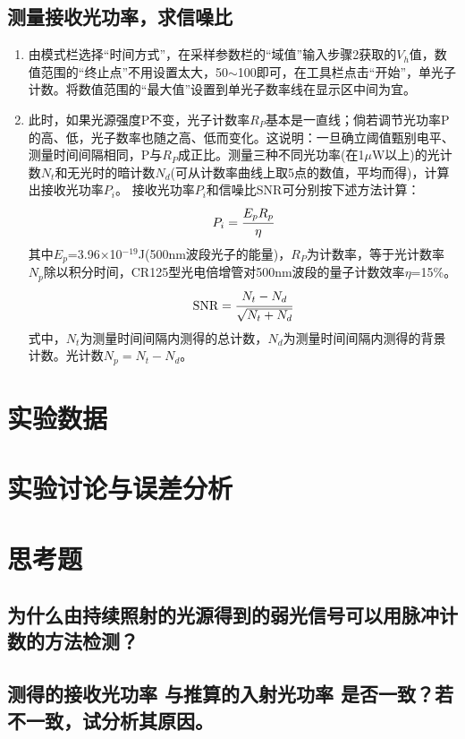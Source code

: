 \documentclass[a4paper]{article}
\begin{document}
\subsection{测量接收光功率，求信噪比}
\begin{enumerate}
\item 由模式栏选择“时间方式”，在采样参数栏的“域值”输入步骤2获取的$V_h$值，数值范围的“终止点”不用设置太大，50$\sim$100即可，在工具栏点击“开始”，单光子计数。将数值范围的“最大值”设置到单光子数率线在显示区中间为宜。 
\item 此时，如果光源强度P不变，光子计数率$R_P$基本是一直线；倘若调节光功率P的高、低，光子数率也随之高、低而变化。这说明：一旦确立阈值甄别电平、测量时间间隔相同，P与$R_P$成正比。测量三种不同光功率(在1$\mu$W以上)的光计数$N_t$和无光时的暗计数$N_d$(可从计数率曲线上取5点的数值，平均而得)，计算出接收光功率$P_i$。
接收光功率$P_i$和信噪比SNR可分别按下述方法计算：
\begin{equation}
P_i = \cfrac{E_pR_p}{\eta}\label{eq4}
\end{equation}
其中$E_p$=3.96×10$^{-19}$J(500nm波段光子的能量)，$R_P$为计数率，等于光计数率$N_p$除以积分时间，CR125型光电倍增管对500nm波段的量子计数效率$\eta$=15\%。
\begin{equation}
\text{SNR} = \cfrac{N_t - N_d}{\sqrt{N_t + N_d}}\label{eq5}
\end{equation}
式中，$N_t$为测量时间间隔内测得的总计数，$N_d$为测量时间间隔内测得的背景计数。光计数$N_p = N_t - N_d$。
\end{enumerate}

\section{实验数据}

\section{实验讨论与误差分析}

\section{思考题}
\subsection{为什么由持续照射的光源得到的弱光信号可以用脉冲计数的方法检测？}

\subsection{测得的接收光功率 与推算的入射光功率 是否一致？若不一致，试分析其原因。}

\nocite{jiaocai}

\end{document}

